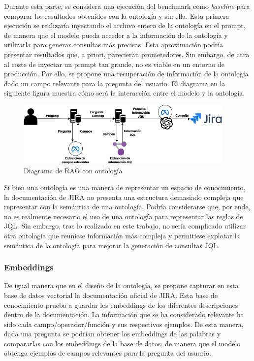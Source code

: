 Durante esta parte, se considera una ejecución del benchmark como \textit{baseline} para comparar los resultados obtenidos con la ontología y sin ella. Esta primera ejecución se realizaría inyectando el archivo entero de la ontología en el prompt, de manera que el modelo pueda acceder a la información de la ontología y utilizarla para generar consultas más precisas.
Esta aproximación podría presentar resultados que, a priori, parecieran prometedores. Sin embargo, de cara al coste de inyectar un prompt tan grande, no es viable en un entorno de producción. Por ello, se propone una recuperación de información de la ontología dado un campo relevante para la pregunta del usuario. El diagrama en la siguiente figura muestra cómo será la interacción entre el modelo y la ontología.

\begin{figure}[H]
    \centering
    \includegraphics[width=0.95\textwidth]{images/rag_ontologia.png}
    \caption{Diagrama de RAG con ontología}\label{fig:ontologia}
\end{figure}
Si bien una ontología es una manera de representar un espacio de conocimiento, la documentación de JIRA no presenta una estructura demasiado compleja que representar con la semántica de una ontología. Podría considerarse que, por ende, no es realmente necesario el uso de una ontología para representar las reglas de JQL. Sin embargo, tras lo realizado en este trabajo, no sería complicado utilizar otra ontología que reuniese información más compleja y permitiese explotar la semántica de la ontología para mejorar la generación de consultas JQL.

\newpage
\subsubsection{Embeddings}
De igual manera que en el diseño de la ontología, se propone capturar en esta base de datos vectorial la documentación oficial de JIRA. Esta base de conocimiento prueba a guardar los embeddings de los diferentes descripciones dentro de la documentación. La información que se ha considerado relevante ha sido cada campo/operador/función y sus respectivos ejemplos. De esta manera, dada una pregunta se podrían obtener los embeddings de las palabras y compararlas con los embeddings de la base de datos, de manera que el modelo obtenga ejemplos de campos relevantes para la pregunta del usuario.

